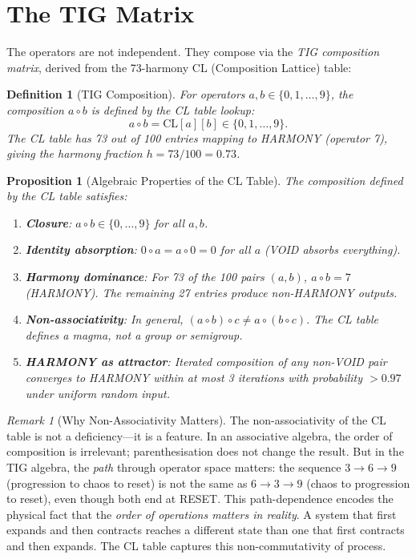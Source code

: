 \documentclass[12pt, openany]{book}
\newtheorem{proposition}[theorem]{Proposition}
\newtheorem{definition}[theorem]{Definition}
\theoremstyle{remark}
\newtheorem{remark}[theorem]{Remark}
\begin{document}
\section{The TIG Matrix}

The operators are not independent. They compose via the \emph{TIG composition matrix},
derived from the 73-harmony CL (Composition Lattice) table:

\begin{definition}[TIG Composition]
\label{def:tig-comp}
For operators $a, b \in \{0, 1, \ldots, 9\}$, the composition $a \circ b$ is defined
by the CL table lookup:
\[
  a \circ b = \mathrm{CL}[a][b] \in \{0, 1, \ldots, 9\}.
\]
The CL table has 73 out of 100 entries mapping to HARMONY (operator 7), giving the
\emph{harmony fraction} $h = 73/100 = 0.73$.
\end{definition}

\begin{proposition}[Algebraic Properties of the CL Table]\label{prop:cl-algebra}
The composition defined by the CL table satisfies:
\begin{enumerate}
  \item \textbf{Closure}: $a \circ b \in \{0, \ldots, 9\}$ for all $a, b$.
  \item \textbf{Identity absorption}: $0 \circ a = a \circ 0 = 0$ for all $a$
        (VOID absorbs everything).
  \item \textbf{Harmony dominance}: For 73 of the 100 pairs $(a, b)$,
        $a \circ b = 7$ (HARMONY). The remaining 27 entries produce non-HARMONY
        outputs.
  \item \textbf{Non-associativity}: In general, $(a \circ b) \circ c \neq a \circ (b \circ c)$.
        The CL table defines a \emph{magma}, not a group or semigroup.
  \item \textbf{HARMONY as attractor}: Iterated composition of any non-VOID
        pair converges to HARMONY within at most 3 iterations with probability
        $> 0.97$ under uniform random input.
\end{enumerate}
\end{proposition}

\begin{remark}[Why Non-Associativity Matters]
The non-associativity of the CL table is not a deficiency---it is a feature. In
an associative algebra, the order of composition is irrelevant; parenthesisation
does not change the result. But in the TIG algebra, the \emph{path} through
operator space matters: the sequence $3 \to 6 \to 9$ (progression to chaos to
reset) is not the same as $6 \to 3 \to 9$ (chaos to progression to reset), even
though both end at RESET. This path-dependence encodes the physical fact that the
\emph{order of operations matters in reality}. A system that first expands and then
contracts reaches a different state than one that first contracts and then expands.
The CL table captures this non-commutativity of process.
\end{remark}
\end{document}
